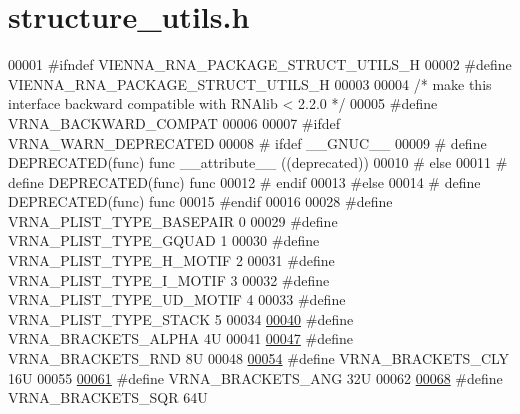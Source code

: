 \hypertarget{structure__utils_8h_source}{}\section{structure\+\_\+utils.\+h}
\label{structure__utils_8h_source}

\begin{DoxyCode}
00001 \textcolor{preprocessor}{#ifndef VIENNA\_RNA\_PACKAGE\_STRUCT\_UTILS\_H}
00002 \textcolor{preprocessor}{#define VIENNA\_RNA\_PACKAGE\_STRUCT\_UTILS\_H}
00003 
00004 \textcolor{comment}{/* make this interface backward compatible with RNAlib < 2.2.0 */}
00005 \textcolor{preprocessor}{#define VRNA\_BACKWARD\_COMPAT}
00006 
00007 \textcolor{preprocessor}{#ifdef VRNA\_WARN\_DEPRECATED}
00008 \textcolor{preprocessor}{# ifdef \_\_GNUC\_\_}
00009 \textcolor{preprocessor}{#  define DEPRECATED(func) func \_\_attribute\_\_ ((deprecated))}
00010 \textcolor{preprocessor}{# else}
00011 \textcolor{preprocessor}{#  define DEPRECATED(func) func}
00012 \textcolor{preprocessor}{# endif}
00013 \textcolor{preprocessor}{#else}
00014 \textcolor{preprocessor}{# define DEPRECATED(func) func}
00015 \textcolor{preprocessor}{#endif}
00016 
00028 \textcolor{preprocessor}{#define VRNA\_PLIST\_TYPE\_BASEPAIR      0}
00029 \textcolor{preprocessor}{#define VRNA\_PLIST\_TYPE\_GQUAD         1}
00030 \textcolor{preprocessor}{#define VRNA\_PLIST\_TYPE\_H\_MOTIF       2}
00031 \textcolor{preprocessor}{#define VRNA\_PLIST\_TYPE\_I\_MOTIF       3}
00032 \textcolor{preprocessor}{#define VRNA\_PLIST\_TYPE\_UD\_MOTIF      4}
00033 \textcolor{preprocessor}{#define VRNA\_PLIST\_TYPE\_STACK         5}
00034 
\hyperlink{group__struct__utils_ga7e3f630af8d69bb0e917145aacf2f96d}{00040} \textcolor{preprocessor}{#define VRNA\_BRACKETS\_ALPHA    4U}
00041 
\hyperlink{group__struct__utils_gac92d5fa7c6625bce2670ece510a24fbd}{00047} \textcolor{preprocessor}{#define VRNA\_BRACKETS\_RND      8U}
00048 
\hyperlink{group__struct__utils_gaf41be40e79cb756c4e0bb8edb4d803d2}{00054} \textcolor{preprocessor}{#define VRNA\_BRACKETS\_CLY      16U}
00055 
\hyperlink{group__struct__utils_ga863e03f7f73f10fc9bbcbefbdda4bec8}{00061} \textcolor{preprocessor}{#define VRNA\_BRACKETS\_ANG      32U}
00062 
\hyperlink{group__struct__utils_ga60525d61d7496eeea490a37f3d6bf757}{00068} \textcolor{preprocessor}{#define VRNA\_BRACKETS\_SQR      64U}

\end{DoxyCode}
